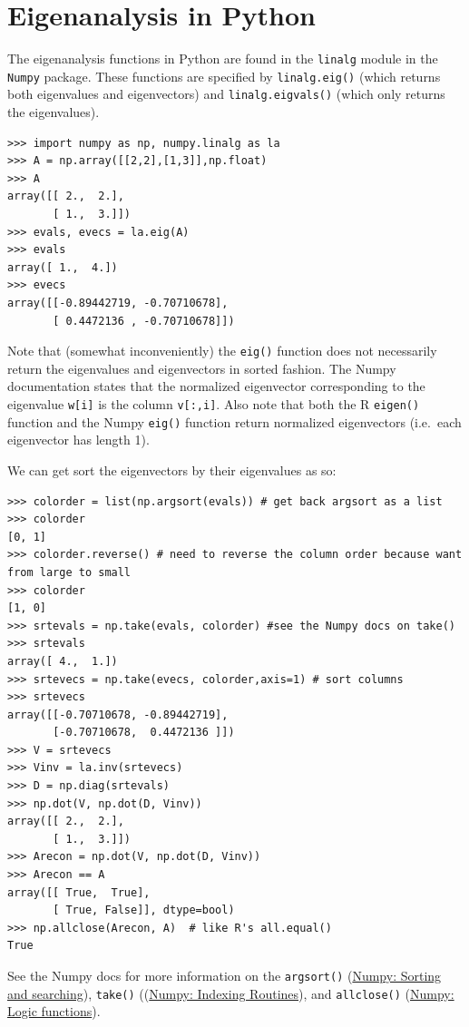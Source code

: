 \section{Eigenanalysis in Python}

The eigenanalysis functions in Python are found in the
\lstinline!linalg! module in the \lstinline!Numpy! package. These
functions are specified by \lstinline!linalg.eig()! (which returns both
eigenvalues and eigenvectors) and \lstinline!linalg.eigvals()! (which
only returns the eigenvalues).

\begin{lstlisting}
>>> import numpy as np, numpy.linalg as la
>>> A = np.array([[2,2],[1,3]],np.float)
>>> A
array([[ 2.,  2.],
       [ 1.,  3.]])
>>> evals, evecs = la.eig(A)
>>> evals
array([ 1.,  4.])
>>> evecs
array([[-0.89442719, -0.70710678],
       [ 0.4472136 , -0.70710678]])
\end{lstlisting}
Note that (somewhat inconveniently) the \lstinline!eig()! function does
not necessarily return the eigenvalues and eigenvectors in sorted
fashion. The Numpy documentation states that the normalized eigenvector
corresponding to the eigenvalue \lstinline!w[i]! is the column
\lstinline!v[:,i]!. Also note that both the R \lstinline!eigen()!
function and the Numpy \lstinline!eig()! function return normalized
eigenvectors (i.e.~each eigenvector has length 1).

We can get sort the eigenvectors by their eigenvalues as so:

\begin{lstlisting}
>>> colorder = list(np.argsort(evals)) # get back argsort as a list
>>> colorder
[0, 1]
>>> colorder.reverse() # need to reverse the column order because want from large to small
>>> colorder
[1, 0]
>>> srtevals = np.take(evals, colorder) #see the Numpy docs on take()
>>> srtevals
array([ 4.,  1.])
>>> srtevecs = np.take(evecs, colorder,axis=1) # sort columns
>>> srtevecs
array([[-0.70710678, -0.89442719],
       [-0.70710678,  0.4472136 ]])
>>> V = srtevecs
>>> Vinv = la.inv(srtevecs)
>>> D = np.diag(srtevals)
>>> np.dot(V, np.dot(D, Vinv))
array([[ 2.,  2.],
       [ 1.,  3.]])
>>> Arecon = np.dot(V, np.dot(D, Vinv))
>>> Arecon == A
array([[ True,  True],
       [ True, False]], dtype=bool)
>>> np.allclose(Arecon, A)  # like R's all.equal()
True     
\end{lstlisting}
See the Numpy docs for more information on the \lstinline!argsort()!
(\href{http://docs.scipy.org/doc/numpy/reference/routines.sort.html}{Numpy:
Sorting and searching}), \lstinline!take()!
((\href{http://docs.scipy.org/doc/numpy/reference/routines.indexing.html}{Numpy:
Indexing Routines}), and \lstinline!allclose()!
(\href{http://docs.scipy.org/doc/numpy/reference/routines.logic.html}{Numpy:
Logic functions}).

